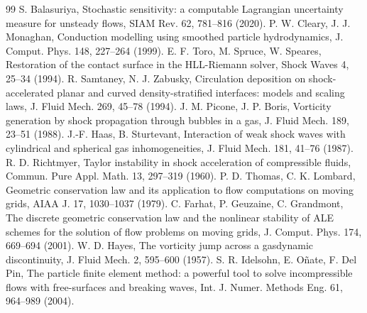 \documentclass[11pt]{article}
\theoremstyle{definition}\newtheorem{definition}{Definition}\theoremstyle{remark}\newtheorem{remark}{Remark}
\begin{document}
\begin{thebibliography}{99}
 S. Balasuriya, Stochastic sensitivity: a computable Lagrangian uncertainty measure for unsteady flows, SIAM Rev. 62, 781--816 (2020).
 P. W. Cleary, J. J. Monaghan, Conduction modelling using smoothed particle hydrodynamics, J. Comput. Phys. 148, 227--264 (1999).
 E. F. Toro, M. Spruce, W. Speares, Restoration of the contact surface in the HLL-Riemann solver, Shock Waves 4, 25--34 (1994).
 R. Samtaney, N. J. Zabusky, Circulation deposition on shock-accelerated planar and curved density-stratified interfaces: models and scaling laws, J. Fluid Mech. 269, 45--78 (1994).
 J. M. Picone, J. P. Boris, Vorticity generation by shock propagation through bubbles in a gas, J. Fluid Mech. 189, 23--51 (1988).
 J.-F. Haas, B. Sturtevant, Interaction of weak shock waves with cylindrical and spherical gas inhomogeneities, J. Fluid Mech. 181, 41--76 (1987).
 R. D. Richtmyer, Taylor instability in shock acceleration of compressible fluids, Commun. Pure Appl. Math. 13, 297--319 (1960).
 P. D. Thomas, C. K. Lombard, Geometric conservation law and its application to flow computations on moving grids, AIAA J. 17, 1030--1037 (1979).
 C. Farhat, P. Geuzaine, C. Grandmont, The discrete geometric conservation law and the nonlinear stability of ALE schemes for the solution of flow problems on moving grids, J. Comput. Phys. 174, 669--694 (2001).
 W. D. Hayes, The vorticity jump across a gasdynamic discontinuity, J. Fluid Mech. 2, 595--600 (1957).
 S. R. Idelsohn, E. O\~nate, F. Del Pin, The particle finite element method: a powerful tool to solve incompressible flows with free-surfaces and breaking waves, Int. J. Numer. Methods Eng. 61, 964--989 (2004).
\end{thebibliography}
\end{document}
